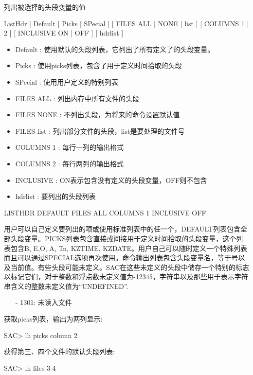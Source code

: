 \label{cmd:listhdr}

列出被选择的头段变量的值

ListHdr [ Default | Picks | SPecial ] [ FILES ALL | NONE | list ] [ COLUMNS 1 | 2 ] [ INCLUSIVE ON | OFF ] [ hdrlist ]

\begin{itemize}
\item Default : 使用默认的头段列表，它列出了所有定义了的头段变量。
\item Picks : 使用picks列表，包含了用于定义时间拾取的头段 
\item SPecial :  使用用户定义的特别列表 
\item FILES ALL : 列出内存中所有文件的头段 
\item FILES NONE : 不列出头段，为将来的命令设置默认值 
\item FILES list : 列出部分文件的头段，list是要处理的文件号 
\item COLUMNS 1 : 每行一列的输出格式  
\item COLUMNS 2 : 每行两列的输出格式  
\item INCLUSIVE :  ON表示包含没有定义的头段变量，OFF则不包含 
\item hdrlist : 要列出的头段列表  
\end{itemize}

LISTHDR DEFAULT FILES ALL COLUMNS 1 INCLUSIVE OFF

用户可以自己定义要列出的项或使用标准列表中的任一个，DEFAULT列表包含全部头段变量。PICKS列表包含直接或间接用于定义时间拾取的头段变量，这个列表包含B, E,O, A, Tn, KZTIME, KZDATE。用户自己可以随时定义一个特殊列表而且可以通过SPECIAL选项再次使用。命令输出列表包含头段变量名，等于号以及当前值。有些头段可能未定义。SAC在这些未定义的头段中储存一个特别的标志以标记它们，对于整数和浮点数未定义值为-12345，字符串以及那些用于表示字符串含义的整数未定义值为``UNDEFINED''.

\begin{itemize}
\item[-]1301: 未读入文件
\end{itemize}

获取picks列表，输出为两列显示:
\begin{SACCode}
SAC> lh picks column 2
\end{SACCode}

获得第三、四个文件的默认头段列表:
\begin{SACCode}
SAC> lh files 3 4
\end{SACCode}

